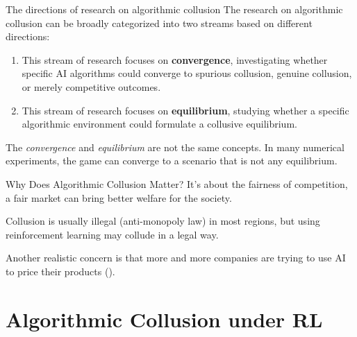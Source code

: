 \documentclass[8pt]{beamer}
\begin{document}
\begin{frame}{The directions of research on algorithmic collusion}
    The research on algorithmic collusion can be broadly categorized into two streams based on different directions:
    \vspace{0.3cm}
    \begin{enumerate}
    	\item This stream of research focuses on \textbf{convergence}, investigating whether specific AI algorithms could converge to spurious collusion, genuine collusion, or merely competitive outcomes.
    	\item This stream of research focuses on \textbf{equilibrium}, studying whether a specific algorithmic environment could formulate a collusive equilibrium. 
    \end{enumerate}
    \vspace{0.3cm}
    The \textit{convergence} and \textit{equilibrium} are not the same concepts. In many numerical experiments, the game can converge to a scenario that is not any equilibrium.
\end{frame}

\begin{frame}{Why Does Algorithmic Collusion Matter?}
    It's about the fairness of competition, a fair market can bring better welfare for the society.

    \vspace{1.5cm}

    Collusion is usually illegal (anti-monopoly law) in most regions, but using reinforcement learning may collude in a legal way.

    \vspace{1.5cm}
    Another realistic concern is that more and more companies are trying to use AI to price their products (\cite{spann2024algorithmic}).
\end{frame}

\section{Algorithmic Collusion under RL}
\end{document}
